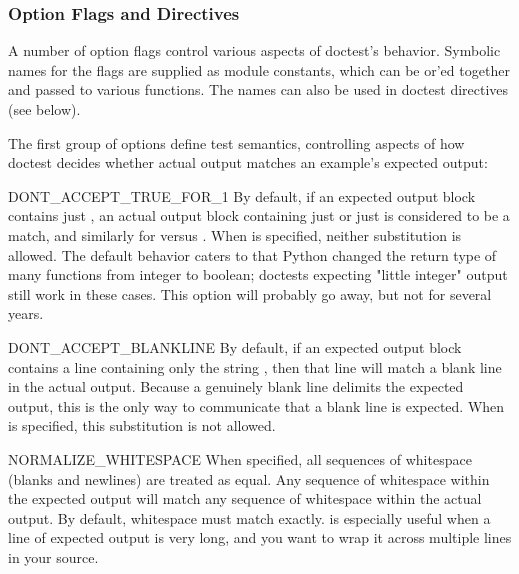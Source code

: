 
\subsubsection{Option Flags and Directives\label{doctest-options}}

A number of option flags control various aspects of doctest's
behavior.  Symbolic names for the flags are supplied as module constants,
which can be or'ed together and passed to various functions.  The names
can also be used in doctest directives (see below).

The first group of options define test semantics, controlling
aspects of how doctest decides whether actual output matches an
example's expected output:

\begin{datadesc}{DONT_ACCEPT_TRUE_FOR_1}
    By default, if an expected output block contains just ,
    an actual output block containing just  or just
     is considered to be a match, and similarly for 
    versus .  When  is
    specified, neither substitution is allowed.  The default behavior
    caters to that Python changed the return type of many functions
    from integer to boolean; doctests expecting "little integer"
    output still work in these cases.  This option will probably go
    away, but not for several years.
\end{datadesc}

\begin{datadesc}{DONT_ACCEPT_BLANKLINE}
    By default, if an expected output block contains a line
    containing only the string , then that line
    will match a blank line in the actual output.  Because a
    genuinely blank line delimits the expected output, this is
    the only way to communicate that a blank line is expected.  When
     is specified, this substitution
    is not allowed.
\end{datadesc}

\begin{datadesc}{NORMALIZE_WHITESPACE}
    When specified, all sequences of whitespace (blanks and newlines) are
    treated as equal.  Any sequence of whitespace within the expected
    output will match any sequence of whitespace within the actual output.
    By default, whitespace must match exactly.
     is especially useful when a line
    of expected output is very long, and you want to wrap it across
    multiple lines in your source.
\end{datadesc}

